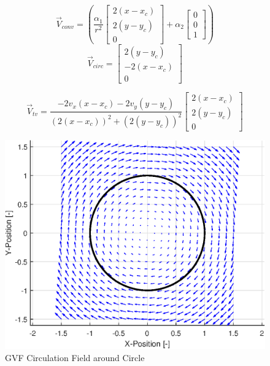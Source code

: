 \documentclass[conf]{new-aiaa}
\begin{document}
\begin{equation}\label{eq:vconv_circle}
\overrightarrow{V}_{conv} = \left(\frac{\alpha_1}{r^2} \begin{bmatrix}  2(x-x_c) \\ 2(y-y_c) \\ 0\end{bmatrix} + \alpha_2 \begin{bmatrix}  0 \\ 0 \\ 1 \end{bmatrix}\right)
\end{equation}
\begin{equation}\label{eq:vcirc_circle}
\overrightarrow{V}_{circ} =  \begin{bmatrix}  2(y-y_c) \\ -2(x-x_c) \\ 0\end{bmatrix}
\end{equation}

\begin{equation}\label{eq:vtv_circle}
\overrightarrow{V}_{tv} =  \frac{-2 v_x(x - x_c) - 2 v_y(y - y_c)}{(2(x-x_c))^2+(2(y-y_c))^2} \begin{bmatrix} 2 (x-x_c) \\ 2 (y-y_c) \\ 0 \end{bmatrix}
\end{equation}






\begin{figure}[h]
	\centering
	\includegraphics[width=0.7\linewidth]{Circ}
	\caption{GVF Circulation Field around Circle}
	\label{fig:circ}
\end{figure}
\end{document}
